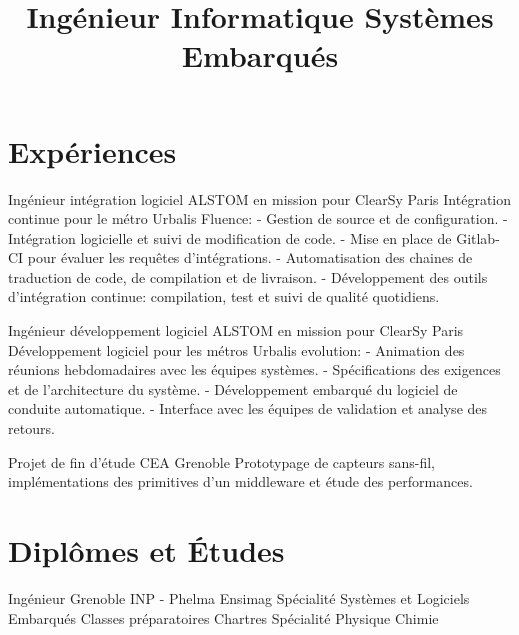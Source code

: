 \documentclass[10pt,a4paper]{moderncv}
\title{\large Ingénieur Informatique Systèmes Embarqués}
\begin{document}
\maketitle

\section{Expériences}

  {Ingénieur intégration logiciel}
  {ALSTOM en mission pour ClearSy}
  {}
  {Paris}
  {Intégration continue pour le métro Urbalis Fluence:\newline{}
  - Gestion de source et de configuration. \newline{}
  - Intégration logicielle et suivi de modification de code. \newline{}
  - Mise en place de Gitlab-CI pour évaluer les requêtes d'intégrations.\newline{} 
  - Automatisation des chaines de traduction de code, de compilation et de livraison.\newline{} 
  - Développement des outils d'intégration continue: compilation, test et suivi de qualité quotidiens.\newline{} }
  
  {Ingénieur développement logiciel}
  {ALSTOM en mission pour ClearSy}
  {}
  {Paris}
  {Développement logiciel pour les métros Urbalis evolution:\newline{}
  - Animation des réunions hebdomadaires avec les équipes systèmes.\newline{}
  - Spécifications des exigences et de l’architecture du système.\newline{}
  - Développement embarqué du logiciel de conduite automatique.\newline{}
  - Interface avec les équipes de validation et analyse des retours.\newline{}}

  {Projet de fin d'étude}
  {CEA}
  {}
  {Grenoble}
  {Prototypage de capteurs sans-fil, implémentations des primitives d'un middleware et étude des performances.\newline{}}

\section{Diplômes et Études}
  {Ingénieur Grenoble INP - Phelma Ensimag}
  {}
  {}
  {}
  {Spécialité Systèmes et Logiciels Embarqués\newline{}}
  {Classes préparatoires}
  {}
  {}
  {Chartres}
  {Spécialité Physique Chimie\newline{}}
\end{document}
